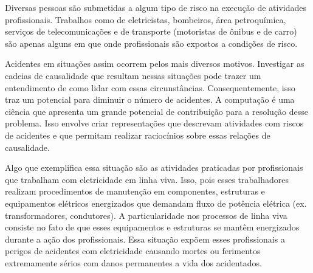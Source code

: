 Diversas pessoas são submetidas a algum tipo de risco na execução de atividades profissionais. Trabalhos como de eletricistas, bombeiros, área petroquímica, serviços de telecomunicações e de transporte (motoristas de ônibus e de carro) são apenas alguns em que onde profissionais são expostos a condições de risco.

Acidentes em situações assim ocorrem pelos mais diversos motivos. Investigar as cadeias de causalidade que resultam nessas situações pode trazer um entendimento de como lidar com essas circunstâncias. Consequentemente, isso traz um potencial para diminuir o número de acidentes. A computação é uma ciência que apresenta um grande potencial de contribuição para a resolução desse problema. Isso envolve criar representações que descrevam atividades com riscos de acidentes e que permitam realizar raciocínios sobre essas relações de causalidade.

Algo que exemplifica essa situação são as atividades praticadas por profissionais que trabalham com eletricidade em linha viva. Isso, pois esses trabalhadores realizam procedimentos de manutenção em componentes, estruturas e equipamentos elétricos energizados que demandam fluxo de potência elétrica (ex. transformadores, condutores). A particularidade nos processos de linha viva consiste no fato de que esses equipamentos e estruturas se mantêm energizados durante a ação dos profissionais. Essa situação expõem esses profissionais a perigos de acidentes com eletricidade causando mortes ou ferimentos extremamente sérios com danos permanentes a vida dos acidentados.  